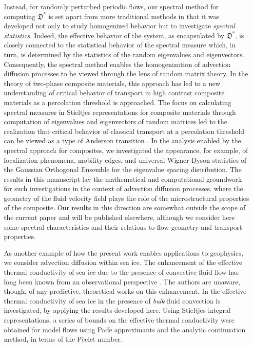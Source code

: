 \documentclass[english,12pt,jmp,graphicx]{revtex4-1}
\newcommand{\Dg}{\mathfrak{D}}
\begin{document}
Instead, for randomly perturbed periodic flows, our spectral method for computing
$\Dg^*$ is set apart from more traditional methods in that it was
developed not only to study homogenized behavior but 
to investigate \textit{spectral statistics}.
Indeed, the effective behavior of the 
system, as encapsulated by $\Dg^*$, is closely connected to the statistical
behavior of the spectral measure which, in turn, is determined by the
statistics of the random eigenvalues and
eigenvectors. Consequently, the spectral method enables the
homogenization of advection diffusion processes 
to be viewed through the lens of
random matrix theory. In the theory of two-phase composite materials, this
approach has led to a new understanding of critical behavior of
transport in high contrast composite materials
as a percolation threshold is approached.
The focus on calculating spectral measures in Stieltjes representations
for composite materials
through computation of eigenvalues and eigenvectors of random matrices
led to the realization that critical behavior of classical transport
at a percolation threshold
can be viewed as a type of Anderson transition \cite{Murphy:PRL:118:036401}.
In the analysis enabled by the spectral approach for composites, 
we investigated the appearance, for example, of localization phenomena,
mobility edges, and universal Wigner-Dyson statistics
of the Gaussian Orthogonal Ensemble
for the eigenvalue spacing distribution.
The results in this
manuscript lay the mathematical and computational 
groundwork for such investigations in the
context of advection diffusion processes, where the geometry of the fluid velocity 
field plays the role of the microstructural properties of the composite.
Our results in
this direction are somewhat outside the scope of the current paper 
and will be published elsewhere, although we consider here
some spectral characteristics and their relations to 
flow geometry and transport properties.     

As another example of how the present work enables applications to geophysics,
we consider advection diffusion within sea ice.
The enhancement of the effective thermal conductivity of sea ice 
due to the presence of convective fluid flow has 
long been known from an observational perspective
\cite{Lytle:JGR-8853,trodahl2001thermal,Golden:GRL:L16501}.
The authors are unaware, though, of any predictive, theoretical works on 
this enhancement.
In \cite{Kraitzman_MMS_2019} the 
effective thermal conductivity of sea ice in the presence 
of {\it bulk} fluid convection is investigated, 
by applying the results developed here.
Using Stieltjes integral representations, a series of 
bounds on the effective thermal conductivity were obtained for model flows
using Pad$\acute{\text{e}}$ approximants and the analytic 
continuation method, in terms of the P$\acute{\text{e}}$clet number. 
\end{document}
